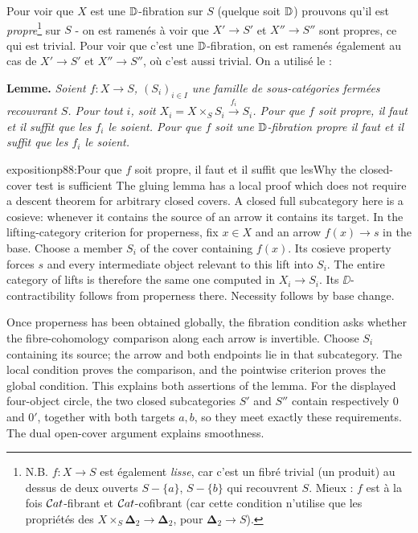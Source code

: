 Pour voir que $X$ est une $\mathbb{D}$-fibration sur $S$ (quelque soit $\mathbb{D}$) prouvons qu'il est \textit{propre}\footnote[45]{N.B. $f : X \to S$ est également \textit{lisse}, car c'est un fibré trivial (un produit) au dessus de deux ouverts $S - \{a\}$, $S - \{b\}$ qui recouvrent $S$. Mieux : $f$ est à la fois $\mathcal{C}at$-fibrant et $\mathcal{C}at$-cofibrant (car cette condition n'utilise que les propriétés des $X \times_S \boldsymbol{\Delta}_2 \to \boldsymbol{\Delta}_2$, pour $\boldsymbol{\Delta}_2 \to S$).} sur $S$ - on est ramenés à voir que $X' \to S'$ et $X'' \to S''$ sont propres, ce qui est trivial. Pour voir que c'est une $\mathbb{D}$-fibration, on est ramenés également au cas de $X' \to S'$ et $X'' \to S''$, où c'est aussi trivial. On a utilisé le : %

\textbf{Lemme.} \textit{Soient $f : X \to S$, $(S_i)_{i \in I}$ une famille de sous-catégories fermées recouvrant $S$. Pour tout $i$, soit $X_i = X \times_S S_i \xrightarrow{f_i} S_i$. Pour que $f$ soit propre, il faut et il suffit que les $f_i$ le soient. Pour que $f$ soit une $\mathbb{D}$-fibration propre il faut et il suffit que les $f_i$ le soient.}

\begin{dcomment}{exposition}{p88:Pour que $f$ soit propre, il faut et il suffit que les}{Why the closed-cover test is sufficient}
The gluing lemma has a local proof which does not require a descent theorem for arbitrary closed covers. A closed full subcategory here is a cosieve: whenever it contains the source of an arrow it contains its target. In the lifting-category criterion for properness, fix $x\in X$ and an arrow $f(x)\to s$ in the base. Choose a member $S_i$ of the cover containing $f(x)$. Its cosieve property forces $s$ and every intermediate object relevant to this lift into $S_i$. The entire category of lifts is therefore the same one computed in $X_i\to S_i$. Its $\DD$-contractibility follows from properness there. Necessity follows by base change.

Once properness has been obtained globally, the fibration condition asks whether the fibre-cohomology comparison along each arrow is invertible. Choose $S_i$ containing its source; the arrow and both endpoints lie in that subcategory. The local condition proves the comparison, and the pointwise criterion proves the global condition. This explains both assertions of the lemma. For the displayed four-object circle, the two closed subcategories $S'$ and $S''$ contain respectively $0$ and $0'$, together with both targets $a,b$, so they meet exactly these requirements. The dual open-cover argument explains smoothness.
\end{dcomment}


